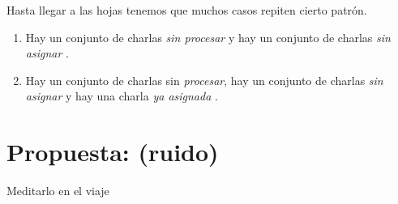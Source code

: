 \documentclass[11pt]{article}
\begin{document}
Hasta llegar a las hojas tenemos que muchos casos repiten cierto patrón.

\begin{enumerate}
\item Hay un conjunto de charlas  {\color{green} \textit{sin procesar}}  y hay un conjunto de charlas {\color{red} \textit{sin asignar}} .

\item Hay un conjunto de charlas sin {\color{green} \textit{procesar}}, hay un conjunto de charlas {\color{red} \textit{sin asignar}} y hay una charla {\color{blue} \textit{ya asignada}}  .

\end{enumerate}

\section{Propuesta: (ruido)}
Meditarlo en el viaje
\end{document}
